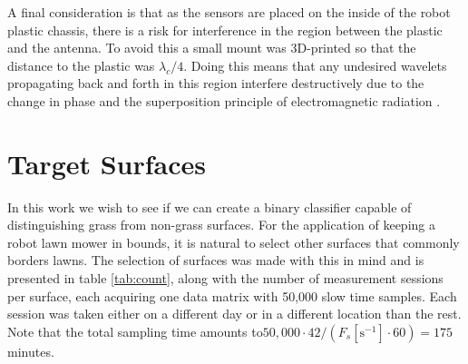 A final consideration is that as the sensors are placed on the inside of the robot plastic chassis, there is a risk for interference in the region between the plastic and the antenna. To avoid this a small mount was 3D-printed so that the distance to the plastic was $\lambda_c/4$. Doing this means that any undesired wavelets propagating back and forth in this region interfere destructively due to the change in phase and the superposition principle of electromagnetic radiation \citep{griffiths_2018}.

\section{Target Surfaces}

In this work we wish to see if we can create a binary classifier capable of distinguishing grass from non-grass surfaces. For the application of keeping a robot lawn mower in bounds, it is natural to select other surfaces that commonly borders lawns. The selection of surfaces was made with this in mind and is presented in table \ref{tab:count}, along with the number of measurement sessions per surface, each acquiring one data matrix with 50,000 slow time samples. Each session was taken either on a different day or in a different location than the rest. Note that the total sampling time amounts to\newline $50,000\cdot42/(F_s [\text{s}^{-1}]\cdot60)=175$ minutes.

